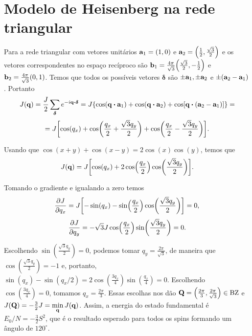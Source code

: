 \documentclass[a4paper,10pt]{article}
\begin{document}
\section{Modelo de Heisenberg na rede triangular}

Para a rede triangular com vetores unitários $\vb{a}_1 = (1,0)$ e $\vb{a}_2 = \qty(\frac{1}{2}, \frac{\sqrt{3}}{2})$ e os vetores correspondentes no espaço recíproco são $\vb{b}_1 = \frac{4\pi}{\sqrt{3}} \qty(\frac{\sqrt{3}}{2}, -\frac{1}{2})$ e $\vb{b}_2 = \frac{4\pi}{\sqrt{3}} \qty(0, 1)$. Temos que todos os possíveis vetores $\bm{\delta}$ são $\pm\vb{a}_1, \pm\vb{a}_2$ e $\pm (\vb{a}_2 - \vb{a}_1)$. Portanto
$$
J(\q) = \frac{J}{2} \sum_{\bm{\delta}} e^{-i \q \vdot \bm{\delta}} =
J \qty{\cos(\q \vdot \vb{a}_1) + \cos(\q \vdot \vb{a}_2) + \cos[\q \vdot (\vb{a}_2 - \vb{a}_1)]} =
$$
$$
= J \qty[\cos(q_x) + \cos(\frac{q_x}{2} + \frac{\sqrt{3} q_y}{2}) + \cos(\frac{q_x}{2} - \frac{\sqrt{3} q_y}{2})].
$$

Usando que $\cos(x+y) + \cos(x-y) = 2 \cos(x) \cos(y)$, temos que
$$
J(\vb{q}) = J \qty[\cos(q_x) + 2 \cos(\frac{q_x}{2}) \cos(\frac{\sqrt{3} q_y}{2})].
$$

Tomando o gradiente e igualando a zero temos
$$
\pdv{J}{q_x} = J \qty[-\sin(q_x) - \sin(\frac{q_x}{2}) \cos(\frac{\sqrt{3} q_y}{2})] = 0,
$$
$$
\pdv{J}{q_y} = - \sqrt{3} J \cos(\frac{q_x}{2}) \sin(\frac{\sqrt{3} q_y}{2}) = 0.
$$

Escolhendo $\sin(\frac{\sqrt{3} q_y}{2}) = 0$, podemos tomar $q_y = \frac{2\pi}{\sqrt{3}}$, de maneira que $\cos(\frac{\sqrt{3} q_y}{2}) = -1$ e, portanto, $\sin(q_x) - \sin(q_x/2) = 2 \cos(\frac{3 q_x}{4}) \sin(\frac{q_x}{4}) = 0$. Escolhendo $\cos(\frac{3q_x}{4}) = 0$, tomamos $q_x = \frac{2\pi}{3}$. Essas escolhas nos dão $\vb{Q} = \qty(\frac{2\pi}{3}, \frac{2\pi}{\sqrt{3}}) \in \text{BZ}$ e $J(\vb{Q}) = -\frac{3}{2} J = \displaystyle{\min_{\vb{q}} J(\vb{q})}$. Assim, a energia do estado fundamental é $E_0 / N  = -\frac{3}{2} S^2$, que é o resultado esperado para todos os spins formando um ângulo de $120^\circ$.
\end{document}
